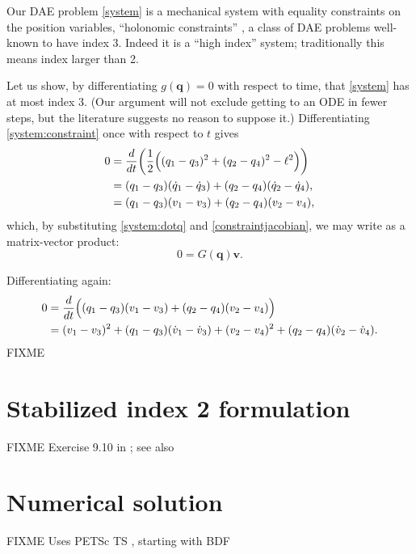 \documentclass[letterpaper,final,12pt,reqno]{amsart}
\newcommand{\bq}{\mathbf{q}}
\newcommand{\bv}{\mathbf{v}}
\begin{document}
Our DAE problem \eqref{system} is a mechanical system with equality constraints on the position variables, ``holonomic constraints'' \cite{Lanczos1970}, a class of DAE problems well-known to have index 3.  Indeed it is a ``high index'' system; traditionally this means index larger than 2.

Let us show, by differentiating $g(\bq)=0$ with respect to time, that \eqref{system} has at most index 3.  (Our argument will not exclude getting to an ODE in fewer steps, but the literature suggests no reason to suppose it.)  Differentiating \eqref{system:constraint} once with respect to $t$ gives
\begin{align}
0 &= \frac{d}{dt} \bigg(\frac{1}{2} \Big((q_1 - q_3)^2 + (q_2 - q_4)^2 - \ell^2\Big)\bigg) \label{rawdconstraint} \\
  &= (q_1 - q_3)(\dot q_1 - \dot q_3) + (q_2 - q_4) (\dot q_2 - \dot q_4), \notag \\
  &= (q_1 - q_3)(v_1 - v_3) + (q_2 - q_4) (v_2 - v_4), \notag
\end{align}
which, by substituting \eqref{system:dotq} and \eqref{constraintjacobian}, we may write as a matrix-vector product:
\begin{equation}
0 = G(\bq) \bv. \label{dconstraint}
\end{equation}

Differentiating again:
\begin{align}
0 &= \frac{d}{dt} \Big((q_1 - q_3)(v_1 - v_3) + (q_2 - q_4) (v_2 - v_4)\Big)  \label{rawddconstraint} \\
  &= (v_1 - v_3)^2 + (q_1 - q_3) (\dot v_1 - \dot v_3) + (v_2 - v_4)^2 + (q_2 - q_4) (\dot v_2 - \dot v_4).  \notag
\end{align}
FIXME


\section{Stabilized index 2 formulation}  FIXME Exercise 9.10 in \cite{AscherPetzold1998}; see also \cite{Gearetal1985}


\section{Numerical solution}

FIXME Uses PETSc TS \cite{Balayetal2021,Bueler2021}, starting with BDF

\small

\bigskip


\end{document}
